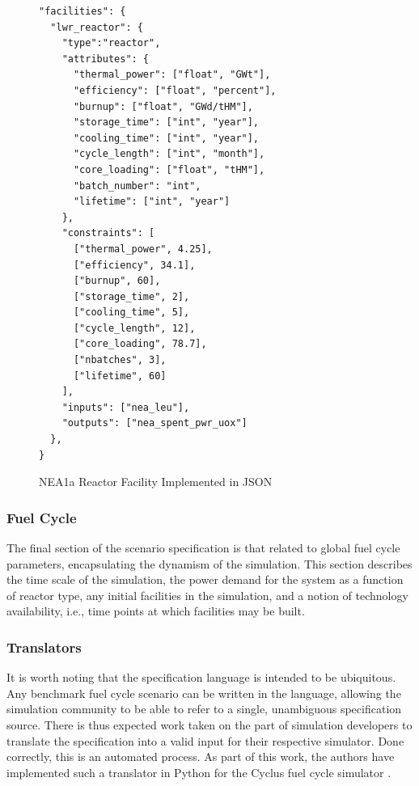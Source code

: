 \documentclass{anstrans}
\begin{document}
\begin{figure}[h!]
\begin{Verbatim}[frame=single]
"facilities": {
  "lwr_reactor": {
    "type":"reactor",
    "attributes": {
      "thermal_power": ["float", "GWt"],
      "efficiency": ["float", "percent"],
      "burnup": ["float", "GWd/tHM"],
      "storage_time": ["int", "year"],
      "cooling_time": ["int", "year"],
      "cycle_length": ["int", "month"],
      "core_loading": ["float", "tHM"],
      "batch_number": "int",
      "lifetime": ["int", "year"]
    },
    "constraints": [
      ["thermal_power", 4.25],
      ["efficiency", 34.1],
      ["burnup", 60],
      ["storage_time", 2],
      ["cooling_time", 5],
      ["cycle_length", 12],
      ["core_loading", 78.7],
      ["nbatches", 3],
      ["lifetime", 60]
    ],
    "inputs": ["nea_leu"],
    "outputs": ["nea_spent_pwr_uox"]
  },
}
\end{Verbatim}
\caption{NEA1a Reactor Facility Implemented in JSON}
\label{fig:facility}
\end{figure}

\subsubsection{Fuel Cycle}
The final section of the scenario specification is that related to global fuel
cycle parameters, encapsulating the dynamism of the simulation. This section
describes the time scale of the simulation, the power demand for the system as a
function of reactor type, any initial facilities in the simulation, and a notion
of technology availability, i.e., time points at which facilities may be built.

\subsubsection{Translators}
It is worth noting that the specification
language is intended to be ubiquitous. Any benchmark fuel cycle scenario can be
written in the language, allowing the simulation community to be able to refer
to a single, unambiguous specification source. There is thus expected 
work taken on the part of simulation developers to translate the
specification into a valid input for their respective  simulator. Done correctly, 
this is an automated process.  As part of this work, the authors
have implemented such a translator in Python for the Cyclus fuel cycle
simulator \cite{cyclus2012}.

\end{document}
